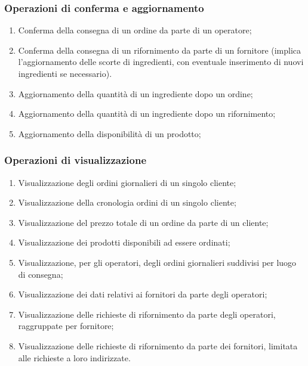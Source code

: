 \documentclass[12pt,a4paper]{article}
\begin{document}
    \subsubsection{Operazioni di conferma e aggiornamento}
    \begin{enumerate}[leftmargin=2.8em,label=\textbf{Op.\arabic*}]
        \item Conferma della consegna di un ordine da parte di un operatore;
        \item Conferma della consegna di un rifornimento da parte di un fornitore (implica l'aggiornamento delle scorte di ingredienti, con eventuale inserimento di nuovi ingredienti se necessario).
        \item Aggiornamento della quantità di un ingrediente dopo un ordine;
        \item Aggiornamento della quantità di un ingrediente dopo un rifornimento;
        \item Aggiornamento della disponibilità di un prodotto;
    \end{enumerate}

    \subsubsection{Operazioni di visualizzazione}
    \begin{enumerate}[leftmargin=2.8em,label=\textbf{Op.\arabic*}]
        \item Visualizzazione degli ordini giornalieri di un singolo cliente;
        \item Visualizzazione della cronologia ordini di un singolo cliente;
        \item Visualizzazione del prezzo totale di un ordine da parte di un cliente;
        \item Visualizzazione dei prodotti disponibili ad essere ordinati;
        \item Visualizzazione, per gli operatori, degli ordini giornalieri suddivisi per luogo di consegna;
        \item Visualizzazione dei dati relativi ai fornitori da parte degli operatori;
        \item Visualizzazione delle richieste di rifornimento da parte degli operatori, raggruppate per fornitore;
        \item Visualizzazione delle richieste di rifornimento da parte dei fornitori, limitata alle richieste a loro indirizzate.
    \end{enumerate}
\end{document}
